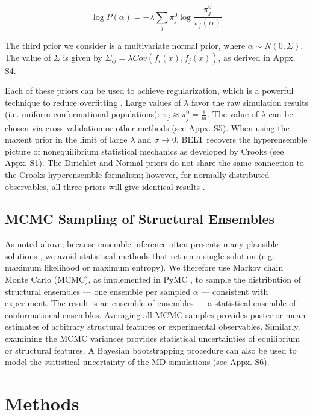 \documentclass[journal=jacsat,manuscript=article]{achemso}
\begin{document}
$$\log P(\alpha) = -\lambda \sum_j \pi_j^0 \log \frac{\pi_j^0}{\pi_j(\alpha)}$$

The third prior we consider is a multivariate normal prior, where  $\alpha \sim N(0, \Sigma)$.  The value of $\Sigma$ is given by $\Sigma_{ij} = \lambda Cov(f_i(x), f_j(x))$, as derived in Appx. S4.

Each of these priors can be used to achieve regularization, which is a powerful technique to reduce overfitting \cite{friedman2001elements}.  Large values of $\lambda$ favor the raw simulation results (i.e. uniform conformational populations): $\pi_j \approx \pi_j^0 = \frac{1}{m}$.  The value of $\lambda$ can be chosen via cross-validation or other methods (see Appx. S5).  When using the maxent prior in the limit of large $\lambda$ and $\sigma \rightarrow 0$, BELT recovers the hyperensemble picture of nonequilibrium statistical mechanics as developed \cite{crooks2007beyond} by Crooks (see Appx. S1).  The Dirichlet and Normal priors do not share the same connection to the Crooks hyperensemble formalism; however, for normally distributed observables, all three priors will give identical results \cite{relative_entropy_wiki}.  

\subsection*{MCMC Sampling of Structural Ensembles}

As noted above, because ensemble inference often presents many plausible solutions  \cite{fisher2010, fisher2011constructing, rieping2005}, we avoid statistical methods that return a single solution (e.g. maximum likelihood or maximum entropy).  We therefore use Markov chain Monte Carlo (MCMC), as implemented in PyMC  \cite{patil2010pymc}, to sample the distribution of structural ensembles --- one ensemble per sampled $\alpha$ --- consistent with experiment.  The result is an ensemble of ensembles --- a statistical ensemble of conformational ensembles.  Averaging all MCMC samples provides posterior mean  estimates of arbitrary structural features or experimental observables.  Similarly, examining the MCMC variances provides statistical uncertainties of equilibrium or structural features.  A Bayesian bootstrapping procedure  \cite{rubin1981} can also be used to model the statistical uncertainty of the MD simulations (see Appx. S6).

\section*{Methods}
\end{document}
